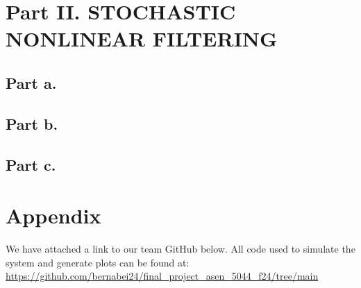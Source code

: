 \documentclass[paper=a4, fontsize=11pt]{scrartcl} %
\numberwithin{equation}{section} %
\numberwithin{figure}{section} %
\numberwithin{table}{section} %
\begin{document}
\section{Part II. STOCHASTIC NONLINEAR FILTERING}
\begin{framed}

\subsection{Part a.}

\subsection{Part b.}

\subsection{Part c.}



\end{framed}




\newpage
\section{Appendix}
\begin{framed}

We have attached a link to our team GitHub below. All code used to simulate the system and generate plots can be found at:
\\
\url{https://github.com/bernabei24/final_project_asen_5044_f24/tree/main}

\end{framed}


   
\end{document}
